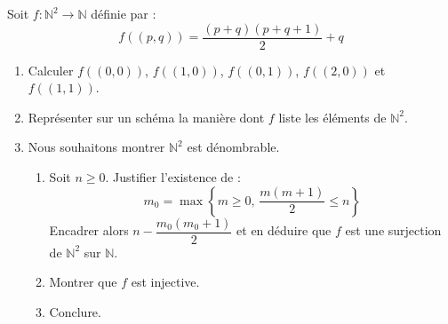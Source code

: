 \documentclass[a4paper,10pt]{report}
\begin{document}
\begin{Exa} Soit $f : \mathbb{N}^2 \rightarrow \mathbb{N}$ définie par :
$$ f((p,q)) = \frac{(p+q)(p+q+1)}{2} + q$$
\begin{enumerate}
\item Calculer $f((0,0))$, $f((1,0))$, $f((0,1))$, $f((2,0))$ et $f((1,1))$.
\item Représenter sur un schéma la manière dont $f$ liste les éléments de $\mathbb{N}^2$.
\item Nous souhaitons montrer $\mathbb{N}^2$ est dénombrable. 
\begin{enumerate}
\item Soit $n \geq 0$. Justifier l'existence de :
$$ m_0 = \max \left\lbrace m \geq 0, \, \frac{m(m+1)}{2} \leq n \right\rbrace$$
Encadrer alors $n-\dfrac{m_0(m_0+1)}{2}$ et en déduire que $f$ est une surjection de $\mathbb{N}^2$ sur $\mathbb{N}$.
\item Montrer que $f$ est injective.
\item Conclure.
\end{enumerate}
\end{enumerate}
\end{Exa}
\end{document}
